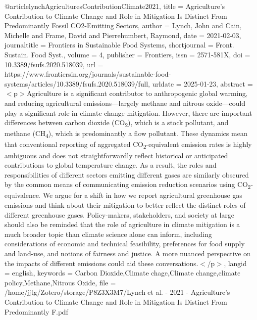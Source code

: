 {{{{@article{lynchAgriculturesContributionClimate2021,
  title = {Agriculture's {{Contribution}} to {{Climate Change}} and {{Role}} in {{Mitigation Is Distinct From Predominantly Fossil CO2-Emitting Sectors}}},
  author = {Lynch, John and Cain, Michelle and Frame, David and Pierrehumbert, Raymond},
  date = {2021-02-03},
  journaltitle = {Frontiers in Sustainable Food Systems},
  shortjournal = {Front. Sustain. Food Syst.},
  volume = {4},
  publisher = {Frontiers},
  issn = {2571-581X},
  doi = {10.3389/fsufs.2020.518039},
  url = {https://www.frontiersin.org/journals/sustainable-food-systems/articles/10.3389/fsufs.2020.518039/full},
  urldate = {2025-01-23},
  abstract = {{$<$}p{$>$}Agriculture is a significant contributor to anthropogenic global warming, and reducing agricultural emissions—largely methane and nitrous oxide—could play a significant role in climate change mitigation. However, there are important differences between carbon dioxide (CO\textsubscript{2}), which is a stock pollutant, and methane (CH\textsubscript{4}), which is predominantly a flow pollutant. These dynamics mean that conventional reporting of aggregated CO\textsubscript{2}-equivalent emission rates is highly ambiguous and does not straightforwardly reflect historical or anticipated contributions to global temperature change. As a result, the roles and responsibilities of different sectors emitting different gases are similarly obscured by the common means of communicating emission reduction scenarios using CO\textsubscript{2}-equivalence. We argue for a shift in how we report agricultural greenhouse gas emissions and think about their mitigation to better reflect the distinct roles of different greenhouse gases. Policy-makers, stakeholders, and society at large should also be reminded that the role of agriculture in climate mitigation is a much broader topic than climate science alone can inform, including considerations of economic and technical feasibility, preferences for food supply and land-use, and notions of fairness and justice. A more nuanced perspective on the impacts of different emissions could aid these conversations.{$<$}/p{$>$}},
  langid = {english},
  keywords = {Carbon Dioxide,Climate chage,Climate change,climate policy,Methane,Nitrous Oxide},
  file = {/home/jjlg/Zotero/storage/P8Z3X3M7/Lynch et al. - 2021 - Agriculture's Contribution to Climate Change and Role in Mitigation Is Distinct From Predominantly F.pdf}
}

}}}}
